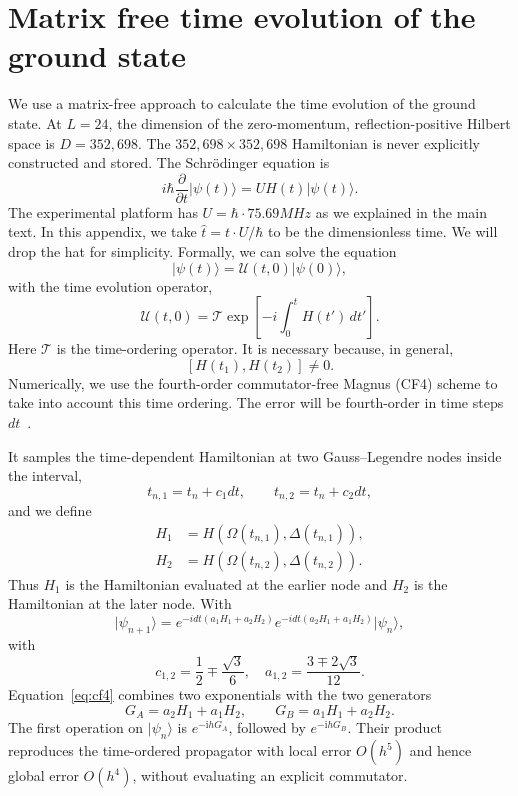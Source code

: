 \documentclass[a4paper,11pt]{article}
\newcommand{\ii}{\mathrm{i}}
\theoremstyle{remark}
\theoremstyle{theorem}
\begin{document}
\section{Matrix free time evolution of the ground state}
We use a matrix-free approach to calculate the time evolution of the ground state.  At $L=24$, the dimension of the zero-momentum, reflection-positive Hilbert space is $D=352{,}698$. The $352{,}698\times352{,}698$ Hamiltonian is never explicitly constructed and stored.
The Schrödinger equation is
\[i\hbar\frac{\partial}{\partial t}\lvert\psi(t)\rangle
=
U H(t)\lvert\psi(t)\rangle .\]
The experimental platform has $U=\hbar \cdot 75.69 MHz$ as we explained in the main text. In this appendix, we take $\hat{t} =t\cdot U/\hbar$ to be the dimensionless time. We will drop the hat for simplicity. 
Formally, we can solve the equation 
\[
\lvert\psi(t)\rangle
=
\mathcal{U}(t,0)\lvert\psi(0)\rangle ,\]
with the time evolution operator,
\[
\mathcal{U}(t,0)
=
\mathcal T
\exp\left[
-i\int_0^t H(t')\,dt'
\right].
\]Here \(\mathcal T\) is the time-ordering operator. It is necessary because, in general,
\[
[H(t_1),H(t_2)]\neq 0.
\]
Numerically, we use the fourth-order commutator-free Magnus (CF4) scheme
to take into account this time ordering. The error will be fourth-order in time steps $dt$~\cite{BlanesMoan2006,AlvermannFehske2011}.

 It samples the time-dependent Hamiltonian at two Gauss--Legendre nodes inside the interval,
\begin{equation*}
t_{n,1}=t_n+c_1dt,\qquad t_{n,2}=t_n+c_2 dt,
\end{equation*}
and we define
\begin{align*}
H_1&=H\!\left(\Omega(t_{n,1}),\Delta(t_{n,1})\right),\\
H_2&=H\!\left(\Omega(t_{n,2}),\Delta(t_{n,2})\right).
\end{align*}
Thus $H_1$ is the Hamiltonian evaluated at the earlier node and $H_2$ is the Hamiltonian at the later node. With
\begin{equation}\label{eq:cf4}
 \vert \psi_{n+1}\rangle=
 e^{-i dt (a_1 H_1+a_2 H_2)}
 e^{-i dt (a_2H_1+a_1H_2)} 
\vert \psi_n\rangle,
\end{equation}
with 
$$
c_{1,2}={}\frac12\mp\frac{\sqrt3}{6}, \quad
a_{1,2}=\frac{3\mp2\sqrt3}{12}.
$$
Equation~\eqref{eq:cf4} combines two exponentials with the two generators
\begin{equation*}
G_A=a_2H_1+a_1H_2,
\qquad
G_B=a_1H_1+a_2H_2.
\end{equation*}
The first operation on $\vert\psi_n\rangle$ is $e^{-\ii hG_A}$, followed by $e^{-\ii hG_B}$.  Their product reproduces the time-ordered propagator with local error $O(h^5)$ and hence global error $O(h^4)$, without evaluating an explicit commutator. 
\end{document}
